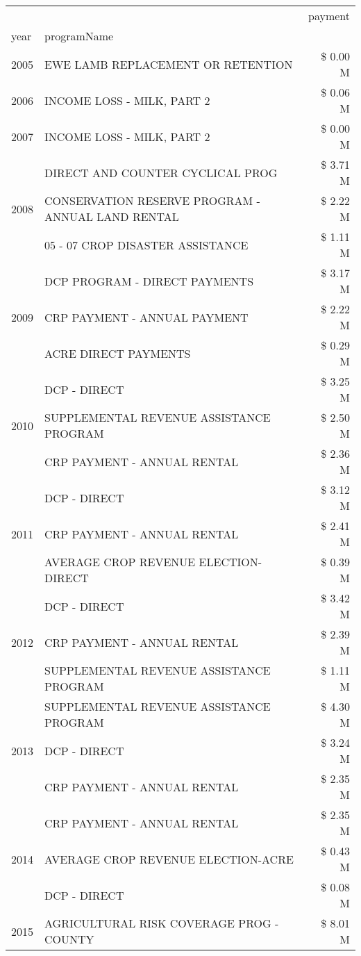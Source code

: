\begin{tabular}{llr}
\toprule
 &  & payment \\
year & programName &  \\
\midrule
2005 & EWE LAMB REPLACEMENT OR RETENTION & \$ 0.00 M \\
\cline{1-3}
2006 & INCOME LOSS - MILK, PART 2 & \$ 0.06 M \\
\cline{1-3}
2007 & INCOME LOSS - MILK, PART 2 & \$ 0.00 M \\
\cline{1-3}
\multirow[t]{3}{*}{2008} & DIRECT AND COUNTER CYCLICAL PROG & \$ 3.71 M \\
 & CONSERVATION RESERVE PROGRAM - ANNUAL LAND RENTAL & \$ 2.22 M \\
 & 05 - 07 CROP DISASTER ASSISTANCE & \$ 1.11 M \\
\cline{1-3}
\multirow[t]{3}{*}{2009} & DCP PROGRAM - DIRECT PAYMENTS & \$ 3.17 M \\
 & CRP PAYMENT - ANNUAL PAYMENT & \$ 2.22 M \\
 & ACRE DIRECT PAYMENTS & \$ 0.29 M \\
\cline{1-3}
\multirow[t]{3}{*}{2010} & DCP - DIRECT & \$ 3.25 M \\
 & SUPPLEMENTAL REVENUE ASSISTANCE PROGRAM & \$ 2.50 M \\
 & CRP PAYMENT - ANNUAL RENTAL & \$ 2.36 M \\
\cline{1-3}
\multirow[t]{3}{*}{2011} & DCP - DIRECT & \$ 3.12 M \\
 & CRP PAYMENT - ANNUAL RENTAL & \$ 2.41 M \\
 & AVERAGE CROP REVENUE ELECTION-DIRECT & \$ 0.39 M \\
\cline{1-3}
\multirow[t]{3}{*}{2012} & DCP - DIRECT & \$ 3.42 M \\
 & CRP PAYMENT - ANNUAL RENTAL & \$ 2.39 M \\
 & SUPPLEMENTAL REVENUE ASSISTANCE PROGRAM & \$ 1.11 M \\
\cline{1-3}
\multirow[t]{3}{*}{2013} & SUPPLEMENTAL REVENUE ASSISTANCE PROGRAM & \$ 4.30 M \\
 & DCP - DIRECT & \$ 3.24 M \\
 & CRP PAYMENT - ANNUAL RENTAL & \$ 2.35 M \\
\cline{1-3}
\multirow[t]{3}{*}{2014} & CRP PAYMENT - ANNUAL RENTAL & \$ 2.35 M \\
 & AVERAGE CROP REVENUE ELECTION-ACRE & \$ 0.43 M \\
 & DCP - DIRECT & \$ 0.08 M \\
\cline{1-3}
\multirow[t]{3}{*}{2015} & AGRICULTURAL RISK COVERAGE PROG - COUNTY & \$ 8.01 M \\

\end{tabular}
